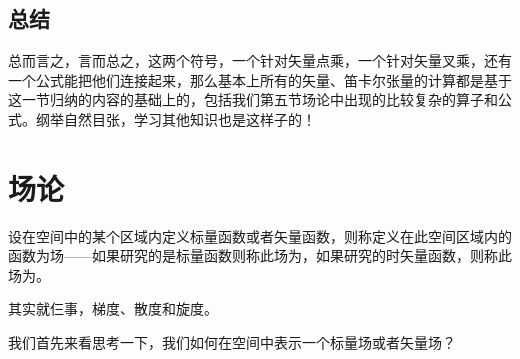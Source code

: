 \documentclass{ctexart}
\begin{document}
\subsection{总结} 
     \begin{结论}{}{}
    总而言之，言而总之，这两个符号，一个针对矢量点乘，一个针对矢量叉乘，还有一个公式能把他们连接起来，那么基本上所有的矢量、笛卡尔张量的计算都是基于这一节归纳的内容的基础上的，包括我们第五节场论中出现的比较复杂的算子和公式。纲举自然目张，学习其他知识也是这样子的！
     \end{结论}

\newpage
\section{场论}
      设在空间中的某个区域内定义标量函数或者矢量函数，则称定义在此空间区域内的函数为场——如果研究的是标量函数则称此场为，如果研究的时矢量函数，则称此场为。\par
      其实就仨事，梯度、散度和旋度。\par
      
      我们首先来看思考一下，我们如何在空间中表示一个标量场或者矢量场？
\end{document}
